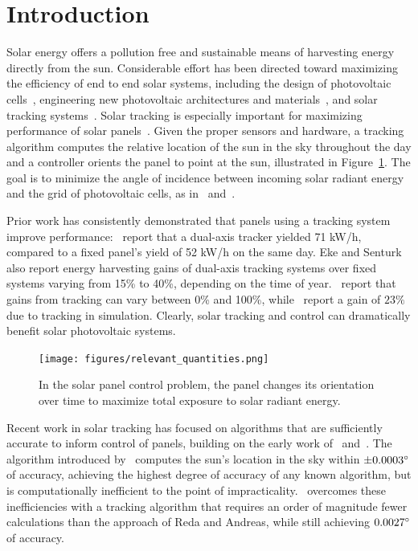 \documentclass{article}
\begin{document}
\section{Introduction}
Solar energy offers a pollution free and sustainable means of harvesting energy directly from the sun. Considerable effort has been directed toward maximizing the efficiency of end to end solar systems, including the design of photovoltaic cells~\cite{Jervase2001,li2012molecular}, engineering new photovoltaic architectures and materials~\cite{li2005high}, and solar tracking systems~\cite{camacho2012control}. Solar tracking is especially important for maximizing performance of solar panels~\cite{Eke2012,Rizk2008,King2001}. Given the proper sensors and hardware, a tracking algorithm computes the relative location of the sun in the sky throughout the day and a controller orients the panel to point at the sun, illustrated in Figure~\ref{fig:solar}. The goal is to minimize the angle of incidence between incoming solar radiant energy and the grid of photovoltaic cells, as in~\citet{Eke2012,Benghanem2011,King2001} and~\citet{kalogirou1996design}.

Prior work has consistently demonstrated that panels using a tracking system improve performance:~\citet{Eke2012} report that a dual-axis tracker yielded 71 kW/h, compared to a fixed panel's yield of 52 kW/h on the same day. Eke and Senturk also report energy harvesting gains of dual-axis tracking systems over fixed systems varying from 15\% to 40\%, depending on the time of year.~\citet{mousazadeh2009review} report that gains from tracking can vary between 0\% and 100\%, while~\citet{clifford2004design} report a gain of $23\%$ due to tracking in simulation. Clearly, solar tracking and control can dramatically benefit solar photovoltaic systems.

\begin{figure}[t]
\begin{center}
\texttt{[image: figures/relevant\_quantities.png]}
\caption{In the solar panel control problem, the panel changes its orientation over time to maximize total exposure to solar radiant energy.}
\label{fig:solar}
\end{center}
\end{figure}

Recent work in solar tracking has focused on algorithms that are sufficiently accurate to inform control of panels, building on the early work of~\citet{spencer1971fourier,walraven1978calculating} and~\citet{michalsky1988astronomical}. The algorithm introduced by~\citet{reda2004solar} computes the sun's location in the sky within $\pm 0.0003\degree$ of accuracy, achieving the highest degree of accuracy of any known algorithm, but is computationally inefficient to the point of impracticality.~\citet{Grena2008} overcomes these inefficiencies with a tracking algorithm that requires an order of magnitude fewer calculations than the approach of Reda and Andreas, while still achieving $0.0027\degree$ of accuracy.
\end{document}
